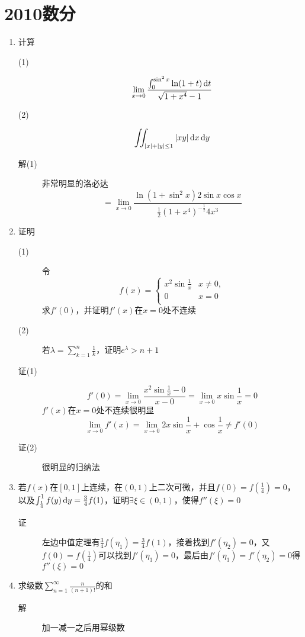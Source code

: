 \section{2010数分}
\begin{enumerate}
\item 计算
\begin{description}
\item[(1)]
\[
\lim_{x \to 0}\frac{\int_0^{\sin^2x}\ln(1+t)\,\mathrm{d} t}{\sqrt{1+x^4}-1}
\]
\item[(2)]
\[
\iint_{|x|+|y|\leq 1}|xy|\,\mathrm{d} x\,\mathrm{d} y
\]
\item[解(1)] 非常明显的洛必达
\[
= \lim_{x \to 0}\frac{\ln(1+\sin^2x)2\sin x\cos x}{\frac{1}{2}(1+x^4)^{-\frac{1}{2}}4x^3}
\]
\end{description}

\item 证明
\begin{description}
\item[(1)] 令
\[
f(x) =
\begin{cases}
x^2\sin\frac{1}{x} & x\neq0,\\
0 & x=0\\
\end{cases}
\]
求$f'(0)$，并证明$f'(x)$在$x=0$处不连续
\item[(2)] 若$\lambda = \sum_{k=1}^n \frac{1}{k}$，证明$e^{\lambda}>n+1$
\item[证(1)]
\[
f'(0) =\lim_{x\to 0} \frac{x^2\sin\frac{1}{x}-0}{x-0} =\lim_{x\to 0} x\sin\frac{1}{x}=0
\]
$f'(x)$在$x=0$处不连续很明显
\[
\lim_{x\to 0} f'(x) = \lim_{x\to 0} 2x\sin\frac{1}{x}+\cos\frac{1}{x}\neq f'(0)
\]
\item[证(2)] 很明显的归纳法
\end{description}

\item 若$f(x)$在$[0,1]$上连续，在$(0,1)$上二次可微，并且$f(0)=f(\frac{1}{4})=0$，以及$\int_{\frac{1}{4}}^1 f(y)\,\mathrm{d} y=\frac{3}{4}f(1)$，证明$\exists \xi \in (0,1)$，使得$f''(\xi)=0$
\begin{description}
\item[证] 左边中值定理有$\frac{3}{4}f(\eta_1)=\frac{3}{4}f(1)$，接着找到$f'(\eta_2)=0$，又$f(0)=f(\frac{1}{4})$可以找到$f'(\eta_3)=0$，最后由$f'(\eta_3)=f'(\eta_2)=0$得$f''(\xi)=0$
\end{description}

\item 求级数$\sum_{n=1}^{\infty}\frac{n}{(n+1)!}$的和
\begin{description}
\item[解] 加一减一之后用幂级数
\end{description}


\end{enumerate}
